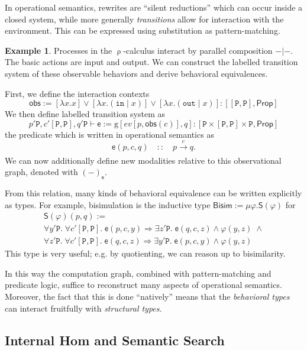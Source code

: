 \documentclass[conference]{IEEEtran}
\theoremstyle{definition}
\newtheorem{example}[theorem]{Example}
\newcommand{\msf}[1]{\mathsf{#1}}
\newcommand{\mrm}[1]{\mathrm{#1}}
\newcommand{\mtt}[1]{\mathtt{#1}}
\newcommand{\xr}[2]{\xrightarrow[#2]{#1}}
\newcommand{\ra}{\Rightarrow}
\newcommand{\Prop}{\msf{Prop}}
\newcommand{\PP}{\mtt{P}}
\newcommand{\tto}{\mtt{out}}
\newcommand{\tti}{\mtt{in}}
\begin{document}
In operational semantics, rewrites are ``silent reductions'' which can occur inside a closed system, while more generally \textit{transitions} allow for interaction with the environment. This can be expressed using substitution as pattern-matching.
\begin{example}
    Processes in the $\uprho$-calculus interact by parallel composition $-|-$. The basic actions are input and output. We can construct the labelled transition system of these observable behaviors and derive behavioral equivalences.
    
    First, we define the interaction contexts
    \[\msf{obs}:= [\lambda x.x]\lor [ \lambda x.(\tti\;|\; x)]\lor [ \lambda x.(\tto \;|\; x)]:[[\PP,\PP],\Prop]\]
    We then define labelled transition system as
    \[p'\PP,c'[\PP,\PP],q'\PP\vdash \msf{e}:=\mrm{g}[ev[p,\msf{obs}(c)],q]:[\PP\times[\PP,\PP]\times\PP,\Prop]\]
    the predicate which is written in operational semantics as
    \[\msf{e}(p,c,q) \quad :: \quad p\xr{c}{} q.\]
    We can now additionally define new modalities relative to this observational graph, denoted with $(-)_\msf{e}$.
    
    From this relation, many kinds of behavioral equivalence can be written explicitly as types. For example, bisimulation is the inductive type $\msf{Bisim}:=\mu \varphi.\msf{S}(\varphi)$ for
    \[\begin{array}{l}
        \msf{S}(\varphi)(p,q) :=\\
        \forall y'\PP.\; \forall c'[\PP,\PP].\; \msf{e}(p,c,y)
        \ra \exists z'\PP.\; \msf{e}(q,c,z) \land \varphi(y,z) \; \land \\
        \forall z'\PP.\; \forall c'[\PP,\PP].\; \msf{e}(q,c,z)
        \ra \exists y'\PP.\; \msf{e}(p,c,y) \land \varphi(y,z)
    \end{array}\]
    This type is very useful; e.g. by quotienting, we can reason up to bisimilarity.
    
    In this way the computation graph, combined with pattern-matching and predicate logic, suffice to reconstruct many aspects of operational semantics. Moreover, the fact that this is done ``natively'' means that the \textit{behavioral types} can interact fruitfully with \textit{structural types}.
\end{example}

\subsection{Internal Hom and Semantic Search}
\label{ssec:hom}
\end{document}
